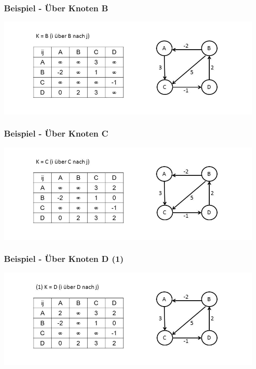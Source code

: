 
\begin{frame}
\frametitle{Beispiel - Über Knoten B}

\includegraphics[width=\linewidth]{floyd_warshall_graphs/graph3.JPG}

\end{frame}


\begin{frame}
\frametitle{Beispiel - Über Knoten C}

\includegraphics[width=\linewidth]{floyd_warshall_graphs/graph4.JPG}

\end{frame}


\begin{frame}
\frametitle{Beispiel - Über Knoten D (1)}

\includegraphics[width=\linewidth]{floyd_warshall_graphs/graph5.JPG}

\end{frame}

